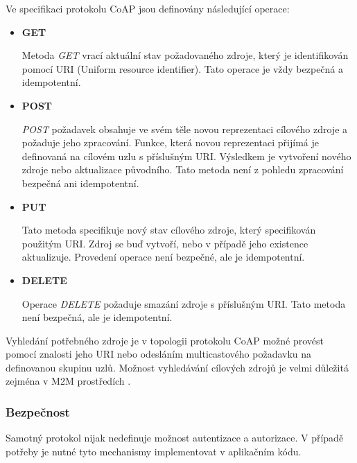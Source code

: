    Ve specifikaci protokolu CoAP jsou definovány následující operace:
   \begin{itemize}
    \item \textbf{GET}
    
    Metoda \textit{GET} vrací aktuální stav požadovaného zdroje, který je identifikován pomocí
    URI (Uniform resource identifier). Tato operace je vždy bezpečná a idempotentní.
    
    \item \textbf{POST}
    
    \textit{POST} požadavek obsahuje ve svém těle novou reprezentaci cílového zdroje a požaduje 
    jeho zpracování. Funkce, která
    novou reprezentaci přijímá je definovaná na cílovém uzlu s příslušným URI.
    Výsledkem je vytvoření nového zdroje nebo aktualizace původního. Tato metoda
    není z pohledu zpracování bezpečná ani idempotentní.
    
    \item \textbf{PUT}
    
    Tato metoda specifikuje nový stav cílového zdroje, který specifikován použitým URI. Zdroj
    se buď vytvoří, nebo 
    v případě jeho existence aktualizuje. Provedení operace není bezpečné, ale 
    je idempotentní.
    
    \item \textbf{DELETE}
    
    Operace \textit{DELETE} požaduje smazání zdroje s příslušným URI. Tato metoda není bezpečná,
    ale je idempotentní.
    
   \end{itemize}
   
   Vyhledání potřebného zdroje je v topologii protokolu CoAP možné provést pomocí
   znalosti jeho URI nebo odesláním multicastového požadavku na definovanou
   skupinu uzlů. Možnost vyhledávání cílových zdrojů je velmi důležitá zejména
   v M2M prostředích \cite{coap}.
   
   \subsubsection{Bezpečnost}
   Samotný protokol nijak nedefinuje možnost autentizace a autorizace. V případě
   potřeby je nutné tyto mechanismy implementovat v aplikačním kódu. 
   
